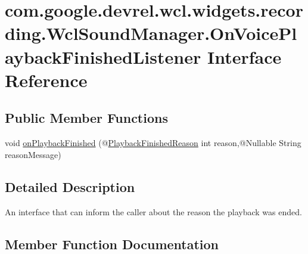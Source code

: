 \hypertarget{interfacecom_1_1google_1_1devrel_1_1wcl_1_1widgets_1_1recording_1_1WclSoundManager_1_1OnVoicePlaybackFinishedListener}{}\section{com.\+google.\+devrel.\+wcl.\+widgets.\+recording.\+Wcl\+Sound\+Manager.\+On\+Voice\+Playback\+Finished\+Listener Interface Reference}
\label{interfacecom_1_1google_1_1devrel_1_1wcl_1_1widgets_1_1recording_1_1WclSoundManager_1_1OnVoicePlaybackFinishedListener}
\subsection*{Public Member Functions}
\begin{DoxyCompactItemize}
\item 
void \hyperlink{interfacecom_1_1google_1_1devrel_1_1wcl_1_1widgets_1_1recording_1_1WclSoundManager_1_1OnVoicePlaybackFinishedListener_a44e4bbac75b55c37cf7cbb8bb251b116}{on\+Playback\+Finished} (@\hyperlink{interfacecom_1_1google_1_1devrel_1_1wcl_1_1widgets_1_1recording_1_1WclSoundManager_1_1PlaybackFinishedReason}{Playback\+Finished\+Reason} int reason,@Nullable String reason\+Message)
\end{DoxyCompactItemize}


\subsection{Detailed Description}
An interface that can inform the caller about the reason the playback was ended. 

\subsection{Member Function Documentation}
